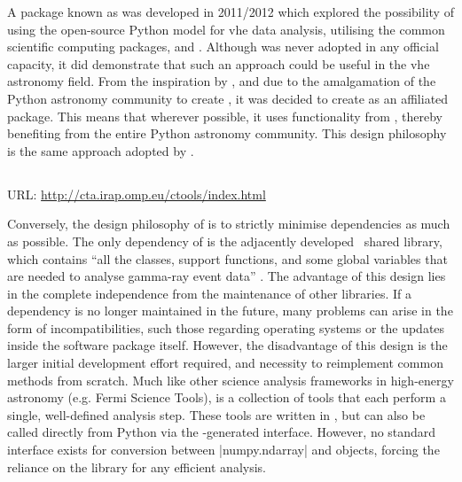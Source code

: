 \noindent A package known as  was developed in 2011/2012 which explored the possibility of using the open-source Python model for \gls{vhe} data analysis, utilising the common scientific computing packages,  and  \cite{Deil2017}. Although  was never adopted in any official capacity, it did demonstrate that such an approach could be useful in the \gls{vhe} astronomy field. From the inspiration by , and due to the amalgamation of the Python astronomy community to create , it was decided to create  as an  affiliated package. This means that wherever possible, it uses functionality from , thereby benefiting from the entire Python astronomy community. This design philosophy is the same approach adopted by . 

\subsection{}
\vspace{-0.7em}
\noindent \hspace{\parindent} {\tiny URL: \url{http://cta.irap.omp.eu/ctools/index.html} \par}

\noindent Conversely, the design philosophy of  is to strictly minimise dependencies as much as possible. The only dependency of  is the adjacently developed  \cpp~shared library, which contains ``all the classes, support functions, and some global variables that are needed to analyse gamma-ray event data'' \cite[][p. 2]{Knodlseder2016}. The advantage of this design lies in the complete independence from the maintenance of other libraries. If a dependency is no longer maintained in the future, many problems can arise in the form of incompatibilities, such those regarding operating systems or the updates inside the software package itself. However, the disadvantage of this design is the larger initial development effort required, and necessity to reimplement common methods from scratch. Much like other science analysis frameworks in high-energy astronomy (e.g. Fermi Science Tools),  is a collection of tools that each perform a single, well-defined analysis step. These tools are written in \cpp, but can also be called directly from Python via the -generated interface. However, no standard interface exists for conversion between |numpy.ndarray| and  objects, forcing the reliance on the  library for any efficient analysis.